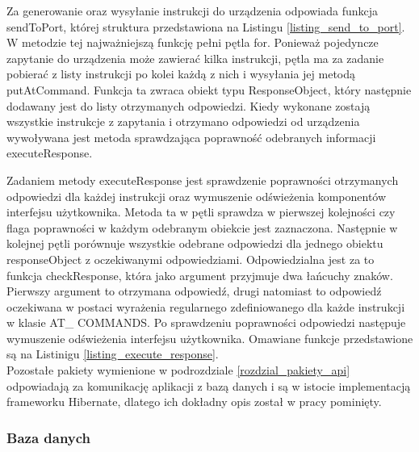 \documentclass[12pt, twoside]{article} %
\numberwithin{equation}{subsection}
\numberwithin{figure}{section}
\numberwithin{table}{section}
\begin{document}
	Za generowanie oraz wysyłanie instrukcji do urządzenia odpowiada funkcja sendToPort, której struktura przedstawiona na Listingu \ref{listing_send_to_port}. W metodzie tej najważniejszą funkcję pełni pętla for. Ponieważ pojedyncze zapytanie do urządzenia może zawierać kilka instrukcji, pętla ma za zadanie pobierać z listy instrukcji po kolei każdą z nich i wysyłania jej metodą putAtCommand. Funkcja ta zwraca obiekt typu ResponseObject, który następnie dodawany jest do listy otrzymanych odpowiedzi. Kiedy wykonane zostają wszystkie instrukcje z zapytania i otrzymano odpowiedzi od urządzenia wywoływana jest metoda sprawdzająca poprawność odebranych informacji executeResponse. 
	\\
	
	
	
	\newpage
	
	Zadaniem metody executeResponse jest sprawdzenie poprawności otrzymanych odpowiedzi dla każdej instrukcji oraz wymuszenie odświeżenia komponentów interfejsu użytkownika. Metoda ta w pętli sprawdza w pierwszej kolejności czy flaga poprawności w każdym odebranym obiekcie 	jest zaznaczona. Następnie w kolejnej pętli porównuje wszystkie odebrane odpowiedzi dla jednego obiektu responseObject z oczekiwanymi odpowiedziami. Odpowiedzialna jest za to funkcja checkResponse, która jako argument przyjmuje dwa łańcuchy znaków. Pierwszy argument to otrzymana odpowiedź, drugi natomiast to odpowiedź oczekiwana w postaci wyrażenia regularnego zdefiniowanego dla każde instrukcji w klasie AT\_ COMMANDS. Po sprawdzeniu poprawności odpowiedzi następuje wymuszenie odświeżenia interfejsu użytkownika. Omawiane funkcje przedstawione są na Listinigu \ref{listing_execute_response}.
	\\
	
		
	
	Pozostałe pakiety wymienione w podrozdziale \ref{rozdzial_pakiety_api} odpowiadają za komunikację aplikacji z bazą danych i są w istocie implementacją frameworku Hibernate, dlatego ich dokładny opis został w pracy pominięty.
	
	\newpage
	
	\subsubsection{Baza danych}
	
\end{document}
